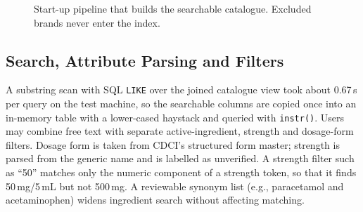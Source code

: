 \documentclass[conference]{IEEEtran}
\begin{document}
\begin{figure}[!t]
\centering
{}
\caption{Start-up pipeline that builds the searchable catalogue. Excluded brands never enter the index.}
\label{fig:pipeline}
\end{figure}

\subsection{Search, Attribute Parsing and Filters}
A substring scan with SQL \texttt{LIKE} over the joined catalogue view took about 0.67\,s per query on the test machine, so the searchable columns are copied once into an in-memory table with a lower-cased haystack and queried with \texttt{instr()}. Users may combine free text with separate active-ingredient, strength and dosage-form filters. Dosage form is taken from CDCI's structured form master; strength is parsed from the generic name and is labelled as unverified. A strength filter such as ``50'' matches only the numeric component of a strength token, so that it finds 50\,mg/5\,mL but not 500\,mg. A reviewable synonym list (e.g., paracetamol and acetaminophen) widens ingredient search without affecting matching.
\end{document}
